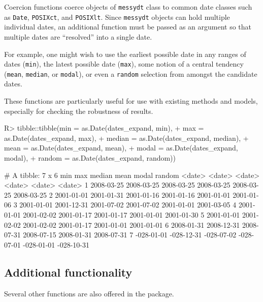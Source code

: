 \documentclass[
]{jss}
\begin{document}
Coercion functions coerce objects of \texttt{messydt} class to common
date classes such as \texttt{Date}, \texttt{POSIXct}, and
\texttt{POSIXlt}. Since \texttt{messydt} objects can hold multiple
individual dates, an additional function must be passed as an argument
so that multiple dates are ``resolved'' into a single date.

For example, one might wish to use the earliest possible date in any
ranges of dates (\texttt{min}), the latest possible date (\texttt{max}),
some notion of a central tendency (\texttt{mean}, \texttt{median}, or
\texttt{modal}), or even a \texttt{random} selection from amongst the
candidate dates.

These functions are particularly useful for use with existing methods
and models, especially for checking the robustness of results.

\begin{CodeChunk}
\begin{CodeInput}
R> tibble::tibble(min = as.Date(dates_expand, min),
+                max = as.Date(dates_expand, max),
+                median = as.Date(dates_expand, median),
+                mean = as.Date(dates_expand, mean),
+                modal = as.Date(dates_expand, modal),
+                random = as.Date(dates_expand, random))
\end{CodeInput}
\begin{CodeOutput}
# A tibble: 7 x 6
  min        max        median     mean       modal      random    
  <date>     <date>     <date>     <date>     <date>     <date>    
1 2008-03-25 2008-03-25 2008-03-25 2008-03-25 2008-03-25 2008-03-25
2 2001-01-01 2001-01-31 2001-01-16 2001-01-16 2001-01-01 2001-01-06
3 2001-01-01 2001-12-31 2001-07-02 2001-07-02 2001-01-01 2001-03-05
4 2001-01-01 2001-02-02 2001-01-17 2001-01-17 2001-01-01 2001-01-30
5 2001-01-01 2001-02-02 2001-02-02 2001-01-17 2001-01-01 2001-01-01
6 2008-01-31 2008-12-31 2008-07-31 2008-07-15 2008-01-31 2008-07-31
7 -028-01-01 -028-12-31 -028-07-02 -028-07-01 -028-01-01 -028-10-31
\end{CodeOutput}
\end{CodeChunk}

\hypertarget{additional-functionality}{%
\subsection{Additional functionality}\label{additional-functionality}}

Several other functions are also offered in the 
package.
\end{document}
